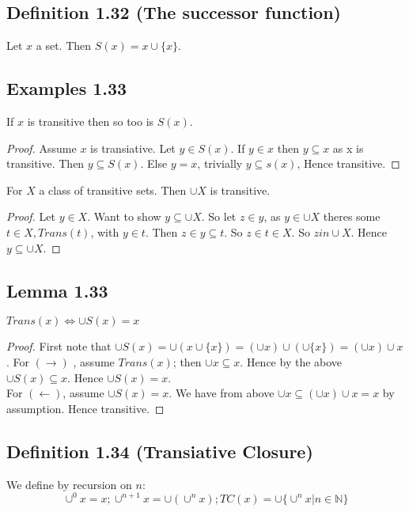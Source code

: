 \documentclass[a4paper, 12pt, twoside]{article}
\begin{document}
\subsection*{Definition 1.32 (The successor function)}
Let $x$ a set. Then $S(x)=x\cup\{x\}$.
\subsection*{Examples 1.33}
If $x$ is transitive then so too is $S(x)$.
\begin{proof}
    Assume $x$ is transiative. Let $y\in S(x)$. If $y\in x$ then $y\subseteq x$ as x is transitive. Then $y\subseteq S(x)$. Else $y=x$, trivially $y\subseteq s(x)$, Hence transitive.
\end{proof}
For $X$ a class of transitive sets. Then $\cup X$ is transitive.
\begin{proof}
    Let $y\in X$. Want to show $y\subseteq \cup X$. So let $z\in y$, as $y\in \cup X$ theres some $t \in X, Trans(t)$, with $y\in t$. Then $z\in y\subseteq t$. So $z\in t\in X$. So $z in \cup X$. Hence $y\subseteq \cup X$.
\end{proof}

\subsection*{Lemma 1.33}
$ Trans(x)\iff \cup S(x)=x$
\begin{proof}
    First note that $\cup S(x)=\cup(x\cup\{x\})=(\cup x) \cup (\cup\{x\})=(\cup x) \cup x$. For $(\rightarrow)$ , assume $Trans(x)$; then $\cup x \subseteq x$. Hence by the above $\cup S(x)\subseteq x$. Hence $\cup S(x)= x$.\\
    For $(\leftarrow)$, assume $\cup S(x)=x$. We have from above $\cup x \subseteq (\cup x)\cup x = x$ by assumption. Hence transitive.
\end{proof}
\subsection*{Definition 1.34 (Transiative Closure)}
We define by recursion on $n$:
$$\cup^{0}x=x;\cup^{n+1}x=\cup(\cup^{n}x); TC(x)=\cup\{\cup^{n}x|n\in \mathbb{N}\} $$
\end{document}
